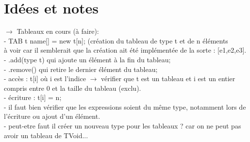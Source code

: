 \documentclass{article}
\begin{document}
\section{Idées et notes}
$\rightarrow$ Tableaux en cours (à faire):\\
- TAB t name[] = new t[n]; (création du tableau de type t et de n éléments\\
à voir car il semblerait que la création ait été implémentée de la sorte : [e1,e2,e3].\\
- .add(type t) qui ajoute un élément à la fin du tableau;\\
- .remove() qui retire le dernier élément du tableau;\\
- accès : t[i] où i est l'indice $\rightarrow$ vérifier que t est un tableau et i est un entier compris entre 0 et la taille du tableau (exclu).\\
- écriture : t[i] = n; \\
- il faut bien vérifier que les expressions soient du même type, notamment lors de l'écriture ou ajout d'un élément.\\
- peut-etre faut il créer un nouveau type pour les tableaux ? car on ne peut pas avoir un tableau de TVoid...
\end{document}
